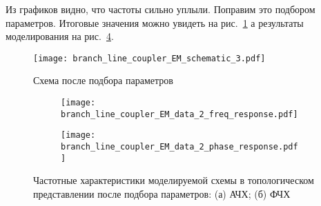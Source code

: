 Из графиков видно, что частоты сильно уплыли. Поправим это подбором параметров. Итоговые значения можно увидеть на рис.~\ref{fig:branch_line_coupler_EM_schematic_3} а результаты моделирования на рис.~\ref{fig:branch_line_coupler_EM_data_2}.

\begin{figure}[!ht]
    \centering
    \texttt{[image: branch\_line\_coupler\_EM\_schematic\_3.pdf]}
    \caption{Схема после подбора параметров}%
    \label{fig:branch_line_coupler_EM_schematic_3}
\end{figure}

\begin{figure}[!ht]
    \centering
    \begin{subfigure}[b]{0.45\textwidth}
        \centering
        \texttt{[image: branch\_line\_coupler\_EM\_data\_2\_freq\_response.pdf]}
        \caption{}%
    \label{fig:branch_line_coupler_EM_data_2_freq_response}
    \end{subfigure}
    \hfill
    \begin{subfigure}[b]{0.45\textwidth}
        \centering
        \texttt{[image: branch\_line\_coupler\_EM\_data\_2\_phase\_response.pdf]}
        \caption{}%
    \label{fig:branch_line_coupler_EM_data_2_phase_response}
    \end{subfigure}
    \caption{%
        Частотные характеристики моделируемой схемы в топологическом представлении после подбора параметров:
        (а) АЧХ;
        (б) ФЧХ
    }%
    \label{fig:branch_line_coupler_EM_data_2}
\end{figure}
